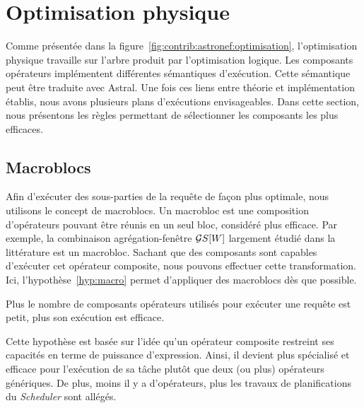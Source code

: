 \section{Optimisation physique}\label{sec:contrib:astronef:physique}
Comme présentée dans la figure~\ref{fig:contrib:astronef:optimisation}, l'optimisation physique travaille sur l'arbre produit par l'optimisation logique. Les composants opérateurs implémentent différentes sémantiques d'exécution. Cette sémantique peut être traduite avec Astral. Une fois ces liens entre théorie et implémentation établis, nous avons plusieurs plans d'exécutions envisageables. Dans cette section, nous présentons les règles permettant de sélectionner les composants les plus efficaces.

\subsection{Macroblocs}
Afin d'exécuter des sous-parties de la requête de façon plus optimale, nous utilisons le concept de macroblocs. Un macrobloc est une composition d'opérateurs pouvant être réunis en un seul bloc, considéré plus efficace. Par exemple, la combinaison agrégation-fenêtre $\mathcal{G} S[W]$ largement étudié dans la littérature est un macrobloc. Sachant que des composants sont capables d'exécuter cet opérateur composite, nous pouvons effectuer cette transformation. Ici, l'hypothèse~\ref{hyp:macro} permet d'appliquer des macroblocs dès que possible.
\begin{hyp}\label{hyp:macro}
    Plus le nombre de composants opérateurs utilisés pour exécuter une requête est petit, plus son exécution est efficace.
\end{hyp}

Cette hypothèse est basée sur l'idée qu'un opérateur composite restreint ses capacités en terme de puissance d'expression. Ainsi, il devient plus spécialisé et efficace pour l'exécution de sa tâche plutôt que deux (ou plus) opérateurs génériques. De plus, moins il y a d'opérateurs, plus les travaux de planifications du \textit{Scheduler} sont allégés.

